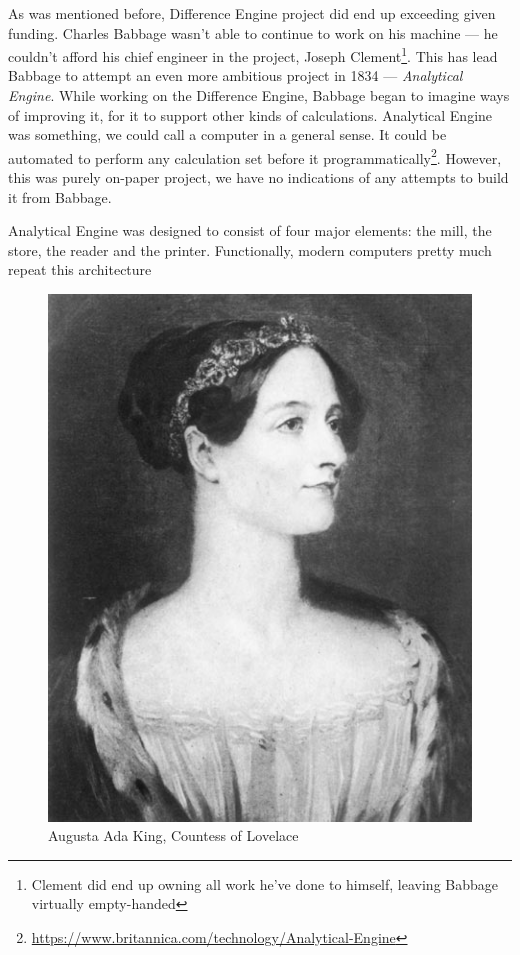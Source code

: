 \documentclass{article}
\begin{document}
            As was mentioned before, Difference Engine project did end up exceeding given funding. Charles Babbage wasn't able to continue to work on his machine --- he couldn't
            afford his chief engineer in the project, Joseph Clement\footnote{Clement did end up owning all work he've done to himself, leaving Babbage virtually empty-handed}.
            This has lead Babbage to attempt an even more ambitious project in 1834 --- \emph{Analytical Engine}. While working on the Difference Engine, Babbage began to imagine
            ways of improving it, for it to support other kinds of calculations. Analytical Engine was something, we could call a computer in a general sense. It could be
            automated to perform any calculation set before it programmatically\footnote{\href{https://www.britannica.com/technology/Analytical-Engine}
            {https://www.britannica.com/technology/Analytical-Engine}}. However, this was purely on-paper project, we have no indications of any attempts to build it from Babbage. \par


            Analytical Engine was designed to consist of four major elements: the mill, the store, the reader and the printer. Functionally, modern computers pretty much
            repeat this architecture


            \begin{figure}
                \centering
                \includegraphics[scale=0.2]{images/persons/person_ada_lovelace.jpg}
                \caption{Augusta Ada King, Countess of Lovelace}
            \end{figure}
\end{document}
